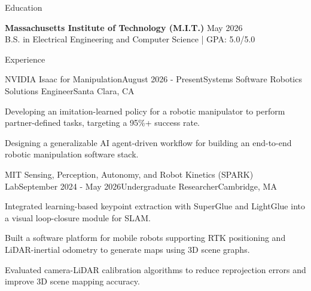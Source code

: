 \documentclass[
	11pt,
]{resume}
\begin{document}
\begin{rSection}{Education}

	\textbf{Massachusetts Institute of Technology (M.I.T.)} \hfill May 2026 \\ 
	B.S. in Electrical Engineering and Computer Science | GPA: 5.0/5.0
\end{rSection}

\begin{rSection}{Experience}

\begin{rSubsection}{NVIDIA Isaac for Manipulation}{August 2026 - Present}{Systems Software Robotics Solutions Engineer}{Santa Clara, CA}
    \item Developing an imitation-learned policy for a robotic manipulator to perform partner-defined tasks, targeting a 95\%+ success rate.
    \item Designing a generalizable AI agent-driven workflow for building an end-to-end robotic manipulation software stack.
\end{rSubsection}

\begin{rSubsection}{MIT Sensing, Perception, Autonomy, and Robot Kinetics (SPARK) Lab}{September 2024 - May 2026}{Undergraduate Researcher}{Cambridge, MA}
    \item Integrated learning-based keypoint extraction with SuperGlue and LightGlue into a visual loop-closure module for SLAM.
    \item Built a software platform for mobile robots supporting RTK positioning and LiDAR-inertial odometry to generate maps using 3D scene graphs.
    \item Evaluated camera-LiDAR calibration algorithms to reduce reprojection errors and improve 3D scene mapping accuracy.
\end{rSubsection}



\end{rSection}
\end{document}
